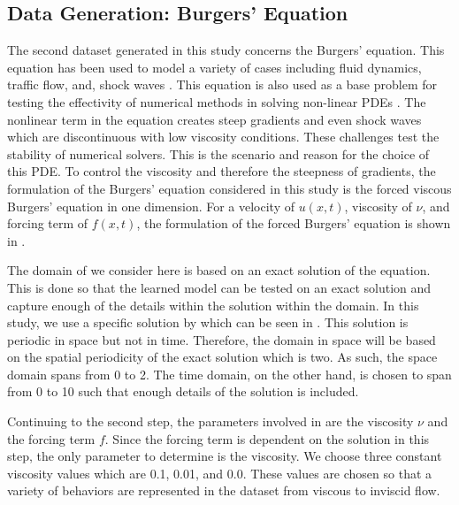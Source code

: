\subsection{Data Generation: Burgers' Equation}\label{sec:data_generation_burgers}
\noindent The second dataset generated in this study concerns the Burgers' equation. This equation has been used to model a variety of cases including fluid dynamics, traffic flow, and, shock waves \autocite{bonkileSystematicLiteratureReview2018,orlandiBurgersEquation2000,becBurgersTurbulence2007,jamesonEnergyEstimatesNonlinear2007}. This equation is also used as a base problem for testing the effectivity of numerical methods in solving non-linear PDEs \autocite{barterShockCapturingPDEbased2008,banksNumericalErrorEstimation2012, tabatabaeiImplicitMethodsNumerical2007,bonkileSystematicLiteratureReview2018}. The nonlinear term in the equation creates steep gradients and even shock waves which are discontinuous with low viscosity conditions. These challenges test the stability of numerical solvers. This is the scenario and reason for the choice of this PDE\@. To control the viscosity and therefore the steepness of gradients, the formulation of the Burgers' equation considered in this study is the forced viscous Burgers' equation in one dimension. For a velocity of \(u(x, t)\), viscosity of \(\nu \), and forcing term of \(f(x, t)\), the formulation of the forced Burgers' equation is shown in .

The domain of we consider here is based on an exact solution of the equation. This is done so that the learned model can be tested on an exact solution and capture enough of the details within the solution within the domain. In this study, we use a specific solution by \textcite{woodExactSolutionBurgers2006} which can be seen in . This solution is periodic in space but not in time. Therefore, the domain in space will be based on the spatial periodicity of the exact solution which is two. As such, the space domain spans from 0 to 2. The time domain, on the other hand, is chosen to span from 0 to 10 such that enough details of the solution is included.

Continuing to the second step, the parameters involved in  are the viscosity \(\nu \) and the forcing term \(f \). Since the forcing term is dependent on the solution in this step, the only parameter to determine is the viscosity. We choose three constant viscosity values which are \num{0.1}, \num{0.01}, and \num{0.0}. These values are chosen so that a variety of behaviors are represented in the dataset from viscous to inviscid flow.

